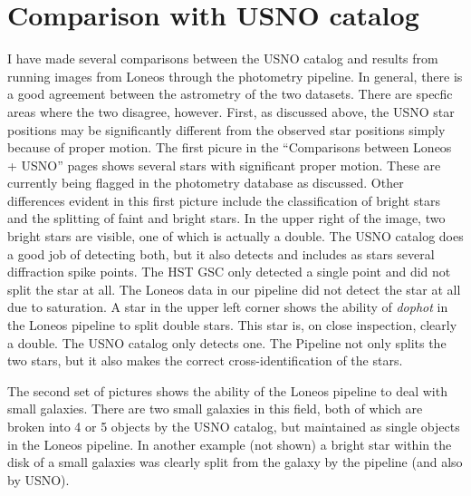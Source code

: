 \documentclass{article}
\newcommand\pr{\em}                   %
\begin{document}
\section {Comparison with USNO catalog}

I have made several comparisons between the USNO catalog and results
from running images from Loneos through the photometry pipeline.  In
general, there is a good agreement between the astrometry of the two
datasets.  There are specfic areas where the two disagree, however.
First, as discussed above, the USNO star positions may be
significantly different from the observed star positions simply
because of proper motion.  The first picure in the ``Comparisons
between Loneos + USNO'' pages shows several stars with significant
proper motion.  These are currently being flagged in the photometry
database as discussed.  Other differences evident in this first
picture include the classification of bright stars and the splitting
of faint and bright stars.  In the upper right of the image, two
bright stars are visible, one of which is actually a double.  The USNO
catalog does a good job of detecting both, but it also detects and
includes as stars several diffraction spike points.  The HST GSC only
detected a single point and did not split the star at all.  The Loneos
data in our pipeline did not detect the star at all due to saturation.
A star in the upper left corner shows the ability of {\pr dophot} in
the Loneos pipeline to split double stars.  This star is, on close
inspection, clearly a double.  The USNO catalog only detects one.  The
Pipeline not only splits the two stars, but it also makes the correct
cross-identification of the stars.  

The second set of pictures shows the ability of the Loneos pipeline to
deal with small galaxies.  There are two small galaxies in this field,
both of which are broken into 4 or 5 objects by the USNO catalog, but
maintained as single objects in the Loneos pipeline.  In another
example (not shown) a bright star within the disk of a small galaxies
was clearly split from the galaxy by the pipeline (and also by USNO).

\appendix
\end{document}
